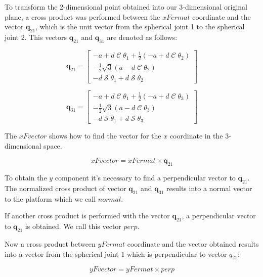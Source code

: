\documentclass[titlepage, letterpaper]{article}
\DeclareMathOperator{\cose}{\mathcal{C}}
\DeclareMathOperator{\sen}{\mathcal{S}}
\begin{document}
To transform the 2-dimensional point obtained into our 3-dimensional original plane, a cross product was performed between the $xFermat$ coordinate and the vector $\mathbf{q}_{21}$, which is the unit vector from the spherical joint 1 to the spherical joint 2.
This vectors $\mathbf{q}_{21}$ and $\mathbf{q}_{31}$ are denoted as follows:

$$ \mathbf{q}_{21} =
\begin{bmatrix}
-a+d \cose \theta_1 + \frac{1}{2}(-a +d \cose \theta_2) \\
-\frac{1}{2}\sqrt{3}(a -d \cose \theta_2) \\
-d \sen \theta_1 + d \sen \theta_2
\end{bmatrix}$$

$$ \mathbf{q}_{31} = \begin{bmatrix}
-a+d \cose \theta_1 + \frac{1}{2}(-a +d \cose \theta_3) \\
-\frac{1}{2}\sqrt{3}(a -d \cose \theta_3) \\
-d \sen \theta_1 + d \sen \theta_3
\end{bmatrix}
$$

The $xFvector$ shows how to find the vector for the $x$ coordinate in the 3-dimensional space.

\begin{equation}
    \label{eq:xFvector}
    xFvector = xFermat \times \mathbf{q}_21
\end{equation}

To obtain the $y$ component it's necessary to find a perpendicular vector to $\mathbf{q}_{21}$.
The normalized cross product of vector $\mathbf{q}_{21}$ and $\mathbf{q}_{31}$ results into a normal vector to the platform which we call $normal$.


If another cross product is performed with the vector $\mathbf{q}_{21}$, a perpendicular vector to $\mathbf{q}_{21}$ is obtained. We call this vector $perp$.


Now a cross product between $yFermat$ coordinate and the vector obtained results into a vector from the spherical joint 1 which is perpendicular to vector $q_{21}$:

\begin{equation}
    \label{eq:yFVector}
    yFvector = yFermat \times perp
\end{equation}
\end{document}
